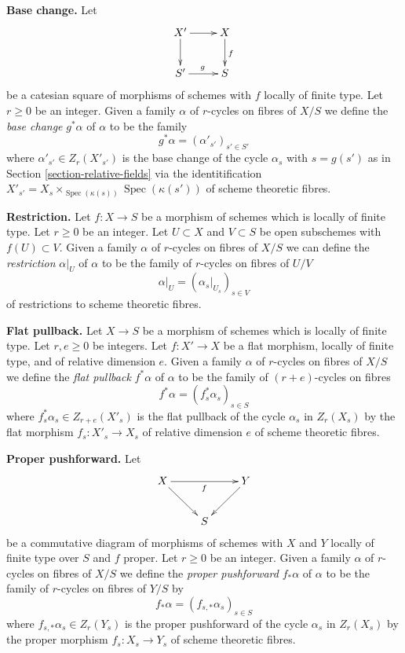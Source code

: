 \documentclass{stacks-project}
\theoremstyle{plain}
\theoremstyle{definition}
\theoremstyle{remark}
\numberwithin{equation}{subsection}
\def\Spec{\mathop{\mathrm{Spec}}}
\begin{document}
\medskip\noindent
{\bf Base change.} Let
$$
\xymatrix{
X' \ar[r] \ar[d] & X \ar[d]^f \\
S' \ar[r]^g & S
}
$$
be a catesian square of morphisms of schemes with $f$ locally of finite type.
Let $r \geq 0$ be an integer. Given a family $\alpha$ of $r$-cycles on
fibres of $X/S$ we define the {\it base change} $g^*\alpha$ of $\alpha$
to be the family
$$
g^*\alpha = (\alpha'_{s'})_{s' \in S'}
$$
where $\alpha'_{s'} \in Z_r(X'_{s'})$ is the base change
of the cycle $\alpha_s$ with $s = g(s')$ as in
Section \ref{section-relative-fields} via the identitification
$X'_{s'} = X_s \times_{\Spec(\kappa(s))} \Spec(\kappa(s'))$
of scheme theoretic fibres.

\medskip\noindent
{\bf Restriction.} Let $f : X \to S$ be a morphism of schemes which is locally
of finite type. Let $r \geq 0$ be an integer. Let $U \subset X$ and
$V \subset S$ be open subschemes with $f(U) \subset V$. Given a family
$\alpha$ of $r$-cycles on fibres of $X/S$ we can define the
{\it restriction} $\alpha|_U$ of $\alpha$ to be the
family of $r$-cycles on fibres of $U/V$
$$
\alpha|_U = (\alpha_s|_{U_s})_{s \in V}
$$
of restrictions to scheme theoretic fibres.

\medskip\noindent
{\bf Flat pullback.} Let $X \to S$ be a morphism of schemes which is locally
of finite type. Let $r, e \geq 0$ be integers. Let $f : X' \to X$ be a
flat morphism, locally of finite type, and of relative dimension $e$.
Given a family $\alpha$ of $r$-cycles
on fibres of $X/S$ we define the {\it flat pullback} $f^*\alpha$ of $\alpha$
to be the family of $(r + e)$-cycles on fibres
$$
f^*\alpha = (f_s^*\alpha_s)_{s \in S}
$$
where $f_s^*\alpha_s \in Z_{r + e}(X'_s)$ is the flat pullback
of the cycle $\alpha_s$ in $Z_r(X_s)$ by the flat morphism
$f_s : X'_s \to X_s$ of relative dimension $e$
of scheme theoretic fibres.

\medskip\noindent
{\bf Proper pushforward.} Let
$$
\xymatrix{
X \ar[rr]_f \ar[rd] & & Y \ar[ld] \\
& S
}
$$
be a commutative diagram of morphisms of schemes with $X$ and $Y$
locally of finite type over $S$ and $f$ proper. Let $r \geq 0$ be an integer.
Given a family $\alpha$ of $r$-cycles on fibres of $X/S$ we define the
{\it proper pushforward} $f_*\alpha$ of $\alpha$ to be the family of
$r$-cycles on fibres of $Y/S$ by
$$
f_*\alpha = (f_{s, *}\alpha_s)_{s \in S}
$$
where $f_{s, *}\alpha_s \in Z_r(Y_s)$ is the proper pushforward
of the cycle $\alpha_s$ in $Z_r(X_s)$ by the proper morphism
$f_s : X_s \to Y_s$ of scheme theoretic fibres.
\end{document}
